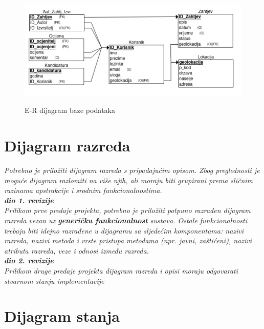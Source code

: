 			\begin{figure}[H]
				\includegraphics[scale=0.65]{slike/dijagram2.jpeg} %
				\centering
				\caption \newline E-R dijagram baze podataka
				\label{fig:promjene}
			\end{figure}
			
			\eject
			
			
		\section{Dijagram razreda}
		
			\textit{Potrebno je priložiti dijagram razreda s pripadajućim opisom. Zbog preglednosti je moguće dijagram razlomiti na više njih, ali moraju biti grupirani prema sličnim razinama apstrakcije i srodnim funkcionalnostima.}\\
			
			\textbf{\textit{dio 1. revizije}}\\
			
			\textit{Prilikom prve predaje projekta, potrebno je priložiti potpuno razrađen dijagram razreda vezan uz \textbf{generičku funkcionalnost} sustava. Ostale funkcionalnosti trebaju biti idejno razrađene u dijagramu sa sljedećim komponentama: nazivi razreda, nazivi metoda i vrste pristupa metodama (npr. javni, zaštićeni), nazivi atributa razreda, veze i odnosi između razreda.}\\
			
			\textbf{\textit{dio 2. revizije}}\\			
			
			\textit{Prilikom druge predaje projekta dijagram razreda i opisi moraju odgovarati stvarnom stanju implementacije}
			
			
			
			\eject
		
		\section{Dijagram stanja}
			
